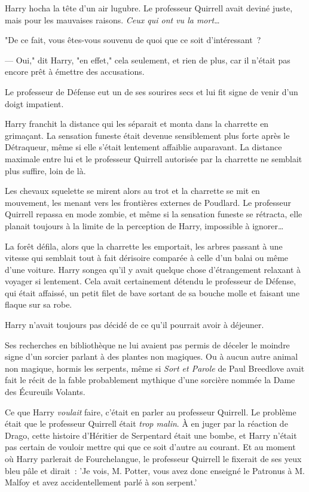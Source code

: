 Harry hocha la tête d'un air lugubre. Le professeur Quirrell avait deviné juste, mais pour les mauvaises raisons. \emph{Ceux qui ont vu la mort…}

"De ce fait, vous êtes-vous souvenu de quoi que ce soit d'intéressant~?

--- Oui," dit Harry, "en effet," cela seulement, et rien de plus, car il n'était pas encore prêt à émettre des accusations.

Le professeur de Défense eut un de ses sourires secs et lui fit signe de venir d'un doigt impatient.

Harry franchit la distance qui les séparait et monta dans la charrette en grimaçant. La sensation funeste était devenue sensiblement plus forte après le Détraqueur, même si elle s'était lentement affaiblie auparavant. La distance maximale entre lui et le professeur Quirrell autorisée par la charrette ne semblait plus suffire, loin de là.

Les chevaux squelette se mirent alors au trot et la charrette se mit en mouvement, les menant vers les frontières externes de Poudlard. Le professeur Quirrell repassa en mode zombie, et même si la sensation funeste se rétracta, elle planait toujours à la limite de la perception de Harry, impossible à ignorer…

La forêt défila, alors que la charrette les emportait, les arbres passant à une vitesse qui semblait tout à fait dérisoire comparée à celle d'un balai ou même d'une voiture. Harry songea qu'il y avait quelque chose d'étrangement relaxant à voyager si lentement. Cela avait certainement détendu le professeur de Défense, qui était affaissé, un petit filet de bave sortant de sa bouche molle et faisant une flaque sur sa robe.

Harry n'avait toujours pas décidé de ce qu'il pourrait avoir à déjeuner.

Ses recherches en bibliothèque ne lui avaient pas permis de déceler le moindre signe d'un sorcier parlant à des plantes non magiques. Ou à aucun autre animal non magique, hormis les serpents, même si \emph{Sort et Parole} de Paul Breedlove avait fait le récit de la fable probablement mythique d'une sorcière nommée la Dame des Écureuils Volants.

Ce que Harry \emph{voulait} faire, c'était en parler au professeur Quirrell. Le problème était que le professeur Quirrell était \emph{trop malin}. À en juger par la réaction de Drago, cette histoire d'Héritier de Serpentard était une bombe, et Harry n'était pas certain de vouloir mettre qui que ce soit d'autre au courant. Et au moment où Harry parlerait de Fourchelangue, le professeur Quirrell le fixerait de ses yeux bleu pâle et dirait~: 'Je vois, M. Potter, vous avez donc enseigné le Patronus à M. Malfoy et avez accidentellement parlé à son serpent.'

